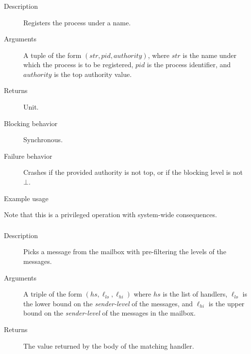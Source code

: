 \subsubsection{}
\begin{description}
    \item [Description] Registers the process under a name.
    \item [Arguments] A tuple of the form $(\mathit{str}, \mathit{pid}, \mathit{authority})$, where $\mathit{str}$ is the name under
which the process is to be registered, $\mathit{pid}$ is the process identifier, and 
$\mathit{authority}$ is the top authority value.
    \item [Returns] Unit.
    \item [Blocking behavior] Synchronous. 
    \item [Failure behavior] Crashes if the provided authority is not top, or if the blocking level is not $\bot$.
    \item [Example usage]
\end{description}

Note that this is a privileged operation with system-wide consequences. 


\subsubsection{}
\begin{description}
    \item [Description] Picks a message from the mailbox with pre-filtering the levels of the messages.
    \item [Arguments] A triple of the form $(\mathit{hs}, \ell_{\mathit{lo}}, \ell_{\mathit{hi}}) $ where $\mathit{hs}$ is the list of handlers, $\ell_{\mathit{lo}}$ is the lower bound on the \emph{sender-level} of the messages, and 
$\ell_{\mathit{hi}}$ is the upper bound on the \emph{sender-level} of the messages in the mailbox.
    \item [Returns] The value returned by the body of the matching handler.
\end{description}



